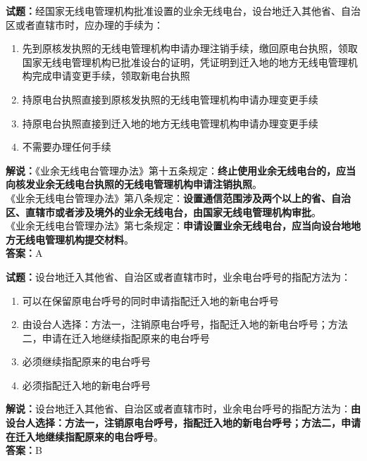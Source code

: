 \documentclass{ctexbook}
\begin{document}
\bigskip




\noindent\textbf{试题：}经国家无线电管理机构批准设置的业余无线电台，设台地迁入其他省、自治区或者直辖市时，应办理的手续为：
\begin{enumerate}[leftmargin=3em]
\item 先到原核发执照的无线电管理机构申请办理注销手续，缴回原电台执照，领取国家无线电管理机构已批准设台的证明，凭证明到迁入地的地方无线电管理机构完成申请变更手续，领取新电台执照
\item 持原电台执照直接到原核发执照的无线电管理机构申请办理变更手续
\item 持原电台执照直接到迁入地的地方无线电管理机构申请办理变更手续
\item 不需要办理任何手续
\end{enumerate}
\noindent\textbf{解说：}《业余无线电台管理办法》第十五条规定：\textbf{终止使用业余无线电台的，应当向核发业余无线电台执照的无线电管理机构申请注销执照}。\\
《业余无线电台管理办法》第八条规定：\textbf{设置通信范围涉及两个以上的省、自治区、直辖市或者涉及境外的业余无线电台，由国家无线电管理机构审批}。\\
《业余无线电台管理办法》第七条规定：\textbf{申请设置业余无线电台，应当向设台地地方无线电管理机构提交材料}。\\\noindent\textbf{答案：}A

\bigskip




\noindent\textbf{试题：}设台地迁入其他省、自治区或者直辖市时，业余电台呼号的指配方法为：
\begin{enumerate}[leftmargin=3em]
\item 可以在保留原电台呼号的同时申请指配迁入地的新电台呼号
\item 由设台人选择：方法一，注销原电台呼号，指配迁入地的新电台呼号；方法二，申请在迁入地继续指配原来的电台呼号
\item 必须继续指配原来的电台呼号
\item 必须指配迁入地的新电台呼号
\end{enumerate}
\noindent\textbf{解说：}设台地迁入其他省、自治区或者直辖市时，业余电台呼号的指配方法为：\textbf{由设台人选择：方法一，注销原电台呼号，指配迁入地的新电台呼号；方法二，申请在迁入地继续指配原来的电台呼号}。\\\noindent\textbf{答案：}B

\bigskip
\end{document}

